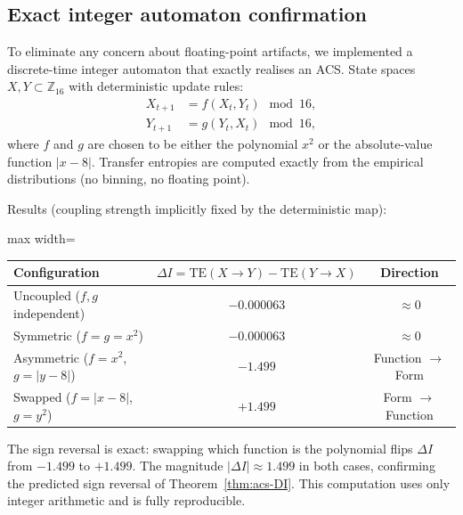 \documentclass[12pt,a4paper]{article}
\theoremstyle{plain}
\theoremstyle{definition}
\theoremstyle{remark}
\newcommand{\TE}{\mathrm{TE}}
\begin{document}
\subsection{Exact integer automaton confirmation}

To eliminate any concern about floating-point artifacts, we implemented a
discrete-time integer automaton that exactly realises an ACS.  State spaces
$X,Y \subset \mathbb{Z}_{16}$ with deterministic update rules:
\begin{align}
  X_{t+1} &= f(X_t, Y_t) \mod 16,\\
  Y_{t+1} &= g(Y_t, X_t) \mod 16,
\end{align}
where $f$ and $g$ are chosen to be either the polynomial $x^2$ or the
absolute‑value function $|x-8|$.  Transfer entropies are computed exactly
from the empirical distributions (no binning, no floating point).

Results (coupling strength implicitly fixed by the deterministic map):

\begin{center}
\begin{adjustbox}{max width=\linewidth}\begin{tabular}{lcc}
\toprule
Configuration & $\Delta I = \TE(X{\to}Y)-\TE(Y{\to}X)$ & Direction \\
\midrule
Uncoupled ($f,g$ independent)      & $-0.000063$ & $\approx 0$ \\
Symmetric ($f=g=x^2$)               & $-0.000063$ & $\approx 0$ \\
Asymmetric ($f=x^2$, $g=|y-8|$)    & $-1.499$    & Function $\to$ Form \\
Swapped ($f=|x-8|$, $g=y^2$)       & $+1.499$    & Form $\to$ Function \\
\bottomrule
\end{tabular}\end{adjustbox}
\end{center}

The sign reversal is exact: swapping which function is the polynomial flips
$\Delta I$ from $-1.499$ to $+1.499$.  The magnitude $|\Delta I| \approx 1.499$
in both cases, confirming the predicted sign reversal of Theorem~\ref{thm:acs-DI}.
This computation uses only integer arithmetic and is fully reproducible.
\end{document}
